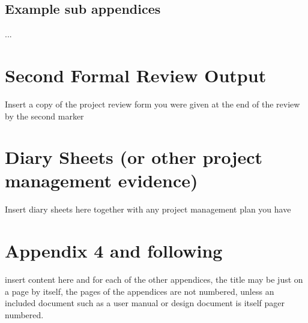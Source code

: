 \documentclass[12pt,a4paper]{article}
\begin{document}



\newpage
\begin{appendices}
\begin{minipage}{\textwidth}
	
\end{minipage}

\begin{subappendices}

\subsection{Example sub appendices}
...
\end{subappendices}

\section{Second Formal Review Output}
Insert a copy of the project review form you were given at the end of the review by the second marker

\section{Diary Sheets (or other project management evidence)}
Insert diary sheets here together with any project management plan you have

\section{Appendix 4 and following}
insert content here and for each of the other appendices, the title may be just on a page by itself, the pages of the appendices are not numbered, unless an included document such as a user manual or design document is itself pager numbered.
\end{appendices}
\end{document}
